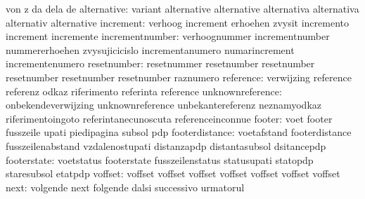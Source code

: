                            von                       z
                           da                        dela
                           de
              alternative: variant                   alternative
                           alternative               alternativa
                           alternativa               alternativ
                           alternative
                increment: verhoog                   increment
                           erhoehen                  zvysit
                           incremento                increment
                           incremente
          incrementnumber: verhoognummer             incrementnumber
                           nummererhoehen            zvysujicicislo
                           incrementanumero          numarincrement
                           incrementenumero
              resetnumber: resetnummer               resetnumber
                           resetnumber               resetnumber
                           resetnumber               resetnumber
                           raznumero
                reference: verwijzing                reference
                           referenz                  odkaz
                           riferimento               referinta
                           reference
         unknownreference: onbekendeverwijzing       unknownreference
                           unbekantereferenz         neznamyodkaz
                           riferimentoingoto         referintanecunoscuta
                           referenceinconnue
                   footer: voet                      footer
                           fusszeile                 upati
                           piedipagina               subsol
                           pdp
           footerdistance: voetafstand               footerdistance
                           fusszeilenabstand         vzdalenostupati
                           distanzapdp               distantasubsol
                           dsitancepdp
              footerstate: voetstatus                footerstate
                           fusszeilenstatus          statusupati
                           statopdp                  staresubsol
                           etatpdp
                  voffset: voffset                   voffset
                           voffset                   voffset
                           voffset                   voffset
                           voffset
                     next: volgende                  next
                           folgende                  dalsi
                           successivo                urmatorul
